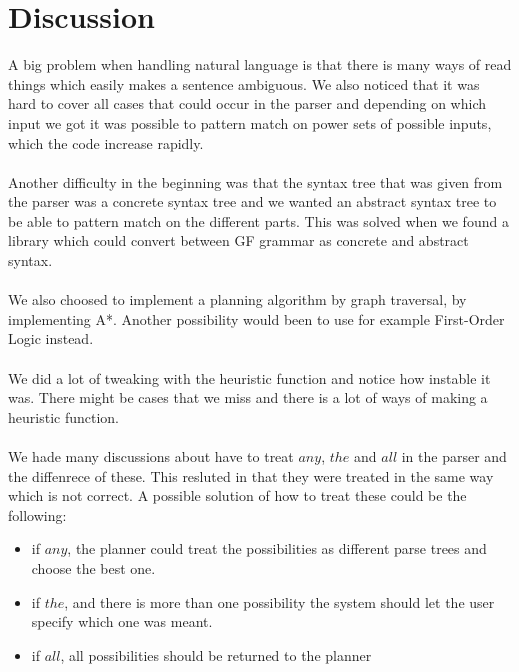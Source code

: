 \section{Discussion}
A big problem when handling natural language is that there is many ways of read things which easily makes a sentence ambiguous. We also noticed that it was hard to cover all cases that could occur in the parser and depending on which input we got it was possible to pattern match on power sets of possible inputs, which the code increase rapidly. \\\\
Another difficulty in the beginning was that the syntax tree that was given from the parser was a concrete syntax tree and we wanted an abstract syntax tree to be able to pattern match on the different parts. This was solved when we found a library which could convert between GF grammar as concrete and abstract syntax. \\\\
We also choosed to implement a planning algorithm by graph traversal, by implementing A*. Another possibility would been to use for example First-Order Logic instead. 
\\\\
We did a lot of tweaking with the heuristic function and notice how instable it was. There might be cases that we miss and there is a lot of ways of making a heuristic function.
\\\\
We hade many discussions about have to treat $any$, $the$ and $all$ in the parser and the diffenrece of these. This resluted in that they were treated in the same way which is not correct. A possible solution of how to treat these could be the following: 
\begin{itemize}
\item if $any$, the planner could treat the possibilities as different parse trees and choose the best one. 
\item if $the$, and there is more than one possibility the system should let the user specify which one was meant. 
\item if $all$, all possibilities should be returned to the planner
\end{itemize}
